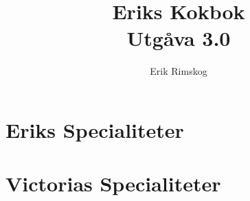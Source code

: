 \documentclass[12pt,a4paper]{article}
\title{\Huge Eriks Kokbok\\\medskip
  \large Utgåva 3.0\\\smallskip
  \small\texttt\shortHEAD}
\author{Erik Rimskog}
\newcommand{\includerecipe}[1]{}
\begin{document}
\maketitle
\thispagestyle{empty}
\newpage
\tableofcontents
\newpage
\part{Eriks Specialiteter}
\includerecipe{korvstroganoff}
\includerecipe{pannkakor}
\includerecipe{carbonara}

\part{Victorias Specialiteter}
\includerecipe{linscurry}
\includerecipe{vegetarisk-lasagne}
\end{document}
